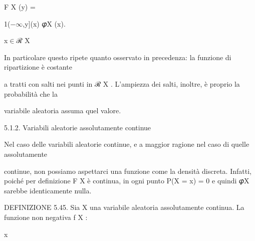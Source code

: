 \documentclass[a4paper,portrait,12pt]{article}
\begin{document}
\begin{flushleft}
F X (y) =
\end{flushleft}





\begin{flushleft}
1($-$$\infty$,y](x) 𝜑X (x).
\end{flushleft}


\begin{flushleft}
x$\in$ℛ X
\end{flushleft}





\begin{flushleft}
In particolare questo ripete quanto osservato in precedenza: la funzione di ripartizione \`{e} costante
\end{flushleft}


\begin{flushleft}
a tratti con salti nei punti in ℛ X . L'ampiezza dei salti, inoltre, \`{e} proprio la probabilit\`{a} che la
\end{flushleft}


\begin{flushleft}
variabile aleatoria assuma quel valore.
\end{flushleft}





\begin{flushleft}
5.1.2. Variabili aleatorie assolutamente continue
\end{flushleft}


\begin{flushleft}
Nel caso delle variabili aleatorie continue, e a maggior ragione nel caso di quelle assolutamente
\end{flushleft}


\begin{flushleft}
continue, non possiamo aspettarci una funzione come la densit\`{a} discreta. Infatti, poich\'{e} per definizione F X \`{e} continua, in ogni punto P(X = x) = 0 e quindi 𝜑X sarebbe identicamente nulla.
\end{flushleft}


\begin{flushleft}
DEFINIZIONE 5.45. Sia X una variabile aleatoria assolutamente continua. La funzione non negativa f X :
\end{flushleft}


\begin{flushleft}
x
\end{flushleft}
\end{document}
